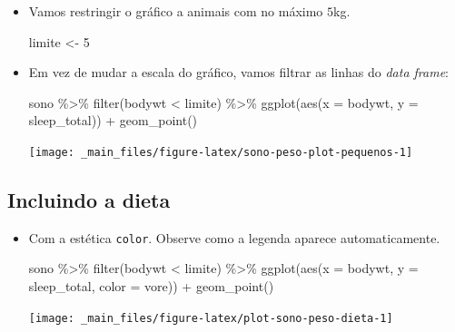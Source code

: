\documentclass[
  11pt]{report}
\newenvironment{Shaded}{\begin{snugshade}}{\end{snugshade}}
\newcommand{\AttributeTok}[1]{\textcolor[rgb]{0.77,0.63,0.00}{#1}}
\newcommand{\DecValTok}[1]{\textcolor[rgb]{0.00,0.00,0.81}{#1}}
\newcommand{\FunctionTok}[1]{\textcolor[rgb]{0.00,0.00,0.00}{#1}}
\newcommand{\NormalTok}[1]{#1}
\newcommand{\OtherTok}[1]{\textcolor[rgb]{0.56,0.35,0.01}{#1}}
\newcommand{\SpecialCharTok}[1]{\textcolor[rgb]{0.00,0.00,0.00}{#1}}
\begin{document}
\begin{itemize}
\item
  Vamos restringir o gráfico a animais com no máximo \(5\)kg.

\begin{Shaded}
\begin{Highlighting}[]
\NormalTok{limite }\OtherTok{\textless{}{-}} \DecValTok{5}
\end{Highlighting}
\end{Shaded}
\item
  Em vez de mudar a escala do gráfico, vamos filtrar as linhas do \emph{data frame}:

\begin{Shaded}
\begin{Highlighting}[]
\NormalTok{sono }\SpecialCharTok{\%\textgreater{}\%} 
  \FunctionTok{filter}\NormalTok{(bodywt }\SpecialCharTok{\textless{}}\NormalTok{ limite) }\SpecialCharTok{\%\textgreater{}\%} 
  \FunctionTok{ggplot}\NormalTok{(}\FunctionTok{aes}\NormalTok{(}\AttributeTok{x =}\NormalTok{ bodywt, }\AttributeTok{y =}\NormalTok{ sleep\_total)) }\SpecialCharTok{+}
    \FunctionTok{geom\_point}\NormalTok{()}
\end{Highlighting}
\end{Shaded}

  \begin{center}\texttt{[image: \_main\_files/figure-latex/sono-peso-plot-pequenos-1]} \end{center}
\end{itemize}

\hypertarget{incluindo-a-dieta}{%
\subsection{Incluindo a dieta}\label{incluindo-a-dieta}}

\begin{itemize}
\item
  Com a estética \texttt{color}. Observe como a legenda aparece automaticamente.

\begin{Shaded}
\begin{Highlighting}[]
\NormalTok{sono }\SpecialCharTok{\%\textgreater{}\%} 
  \FunctionTok{filter}\NormalTok{(bodywt }\SpecialCharTok{\textless{}}\NormalTok{ limite) }\SpecialCharTok{\%\textgreater{}\%} 
  \FunctionTok{ggplot}\NormalTok{(}\FunctionTok{aes}\NormalTok{(}\AttributeTok{x =}\NormalTok{ bodywt, }\AttributeTok{y =}\NormalTok{ sleep\_total, }\AttributeTok{color =}\NormalTok{ vore)) }\SpecialCharTok{+}
    \FunctionTok{geom\_point}\NormalTok{()}
\end{Highlighting}
\end{Shaded}

  \begin{center}\texttt{[image: \_main\_files/figure-latex/plot-sono-peso-dieta-1]} \end{center}
\end{itemize}
\end{document}
